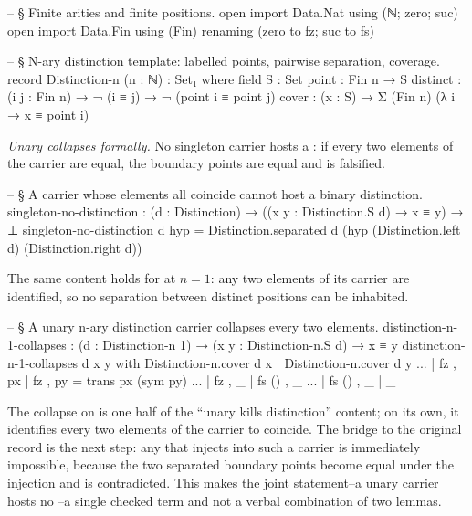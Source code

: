 \documentclass[11pt]{article}
\begin{document}
\begin{code}
-- § Finite arities and finite positions.
open import Data.Nat using (ℕ; zero; suc)
open import Data.Fin using (Fin) renaming (zero to fz; suc to fs)

-- § N-ary distinction template: labelled points, pairwise separation, coverage.
record Distinction-n (n : ℕ) : Set₁ where
  field
    S        : Set
    point    : Fin n → S
    distinct : (i j : Fin n) → ¬ (i ≡ j) → ¬ (point i ≡ point j)
    cover    : (x : S) → Σ (Fin n) (λ i → x ≡ point i)
\end{code}

\emph{Unary collapses formally.}  No singleton carrier hosts a
: if every two elements of the carrier are
equal, the boundary points are equal and  is
falsified.

\begin{code}
-- § A carrier whose elements all coincide cannot host a binary distinction.
singleton-no-distinction :
  (d : Distinction) →
  ((x y : Distinction.S d) → x ≡ y) →
  ⊥
singleton-no-distinction d hyp =
  Distinction.separated d (hyp (Distinction.left d) (Distinction.right d))
\end{code}

The same content holds for  at $n=1$: any two
elements of its carrier are identified, so no separation between
distinct positions can be inhabited.

\begin{code}
-- § A unary n-ary distinction carrier collapses every two elements.
distinction-n-1-collapses :
  (d : Distinction-n 1) →
  (x y : Distinction-n.S d) → x ≡ y
distinction-n-1-collapses d x y
  with Distinction-n.cover d x | Distinction-n.cover d y
... | fz , px | fz , py = trans px (sym py)
... | fz , _  | fs () , _
... | fs () , _ | _
\end{code}

The collapse on   is one half of
the ``unary kills distinction'' content; on its own, it identifies every
two elements of the carrier to coincide.  The bridge to the original
record is the next step: any  that injects
into such a carrier is immediately impossible, because the two
separated boundary points become equal under the injection and
 is contradicted.  This makes the joint
statement--a unary carrier hosts no --a single
checked term and not a verbal combination of two lemmas.
\end{document}
